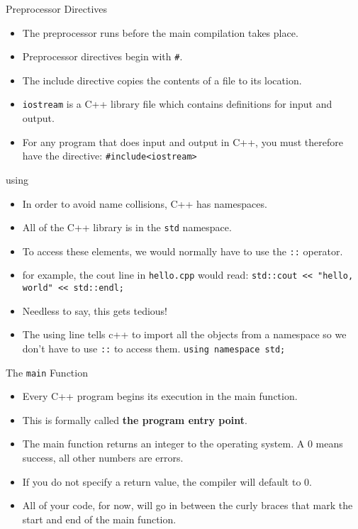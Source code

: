 \documentclass{beamer}
\begin{document}
\begin{frame}{Preprocessor Directives}
    \begin{itemize}[<+->]
        \item The preprocessor runs before the main compilation takes
            place.
        \item Preprocessor directives begin with \texttt{\#}.
        \item The include directive copies the contents of a file to
            its location.
        \item \texttt{iostream} is a C++ library file which contains
            definitions for input and output.
        \item For any program that does input and output in C++, you
            must therefore have the directive:  
            \newline\texttt{\#include<iostream>}
    \end{itemize}
\end{frame}

\begin{frame}{using}
    \begin{itemize}[<+->]
        \item In order to avoid name collisions, C++ has namespaces.
        \item All of the C++ library is in the \texttt{std} namespace.
        \item To access these elements, we would normally have to use
            the \texttt{::} operator.
        \item for example, the cout line in \texttt{hello.cpp} would read:
            \newline\texttt{std::cout << "hello, world" << std::endl;}
        \item Needless to say, this gets tedious!
        \item The using line tells c++ to import all the objects from
            a namespace so we don't have to use \texttt{::} to access
            them.
            \newline
            \texttt{using namespace std;}
    \end{itemize}
\end{frame}

\begin{frame}{The \texttt{main} Function}
    \begin{itemize}[<+->]
        \item Every C++ program begins its execution in the main
            function.
        \item This is formally called \textbf{the program entry point}.
        \item The main function returns an integer to the operating
            system. A 0 means success, all other numbers are errors.
        \item If you do not specify a return value, the compiler will
            default to 0.
        \item All of your code, for now, will go in between the curly
            braces that mark the start and end of the main function.
    \end{itemize}
\end{frame}
\end{document}
